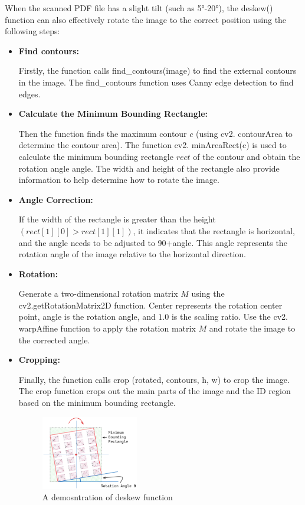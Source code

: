 \documentclass[twocolumn]{article}
\begin{document}
        When the scanned PDF file has a slight tilt (such as 5°-20°), the deskew() function can also effectively rotate the image to the correct position using the following steps:
        \begin{itemize}
            \item \textbf{Find contours:} 
            
            Firstly, the function calls find\_contours(image) to find the external contours in the image. The find\_contours function uses Canny edge detection to find edges.

            \item \textbf{Calculate the Minimum Bounding Rectangle:}
            
            Then the function finds the maximum contour $c$ (using cv2. contourArea to determine the contour area). The function cv2. minAreaRect(c) is used to calculate the minimum bounding rectangle $rect$ of the contour and obtain the rotation angle angle. The width and height of the rectangle also provide information to help determine how to rotate the image.

            \item \textbf{Angle Correction:} 
            
            If the width of the rectangle is greater than the height $(rect [1] [0]>rect [1] [1])$, it indicates that the rectangle is horizontal, and the angle needs to be adjusted to 90+angle. This angle represents the rotation angle of the image relative to the horizontal direction.

            \item \textbf{Rotation:}
            
            Generate a two-dimensional rotation matrix $M$ using the cv2.getRotationMatrix2D function. Center represents the rotation center point, angle is the rotation angle, and $1.0$ is the scaling ratio. Use the cv2. warpAffine function to apply the rotation matrix $M$ and rotate the image to the corrected angle.

            \item \textbf{Cropping:}
            
            Finally, the function calls crop (rotated, contours, h, w) to crop the image. The crop function crops out the main parts of the image and the ID region based on the minimum bounding rectangle.

        \begin{figure}[ht]
            \centering
            \includegraphics[width=0.4\textwidth]{deskew.png}
            \caption{A demosntration of deskew function}
            \label{fig:deskew}
        \end{figure}
        \end{itemize}
\end{document}
